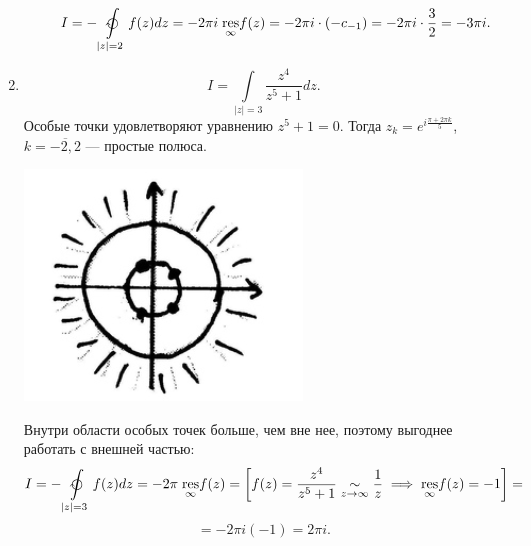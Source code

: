 \documentclass[../../main.tex]{subfiles}
\begin{document}
\begin{examples}
\begin{enumerate}
\begin{enumerate}
\begin{center}
	 			\end{center}
	 			\[
	 			I=-\ointclockwise\limits_{|z|=2}f(z)dz= -2\pi i\; \underset{\infty}{\res} 
	 			f(z) = 
	 			-2\pi i \cdot(-c_{-1}) = -2 \pi i \cdot \dfrac{3}{2} = -3\pi i.\]
			\end{enumerate}
			\item \[I=\int\limits_{|z|=3} \dfrac{z^4}{z^5+1}dz.\]
			Особые точки удовлетворяют уравнению $z^5+1=0$.
			Тогда $z_k=e^{i\tfrac{\pi+2\pi k}{5}}$, $k=\overline{-2,2}$ ---
			простые полюса.
 			\begin{center}
			\includegraphics{lec35_5}
			\end{center}
			Внутри области особых точек больше, чем вне нее, поэтому выгоднее 
			работать с внешней частью:
 			\[I=-\ointclockwise
 			\limits_{|z|=3}f(z)dz=-2\pi\;\underset{\infty}{\res}f(z)=\left[ 
 			f(z)=\dfrac{z^4}{z^5+1} \underset{z \rightarrow \infty}\sim \dfrac 1z 
 			\implies 
 			\underset{\infty}{\res} f(z)=-1 \right]=\]\[=-2\pi i(-1) = 2\pi i.
 			\]	
	 	\end{enumerate}
	 \end{examples}	
\end{document}
